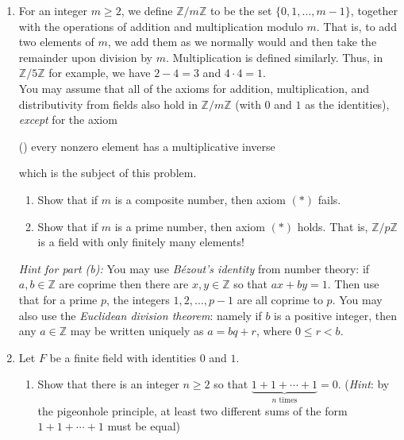 \documentclass[12pt, letterpaper]{article}
\newcommand{\0}{\mathbf{0}}
\newcommand{\1}{\mathbf{1}}
\begin{document}
\begin{enumerate}
    \vspace{0.5cm}

    \item 
    For an integer $m \geq 2$, we define $\mathbb{Z}/m\mathbb{Z}$ to be the set $\{0, 1, \dots, m - 1\}$, together with the operations of addition and multiplication modulo $m$. That is, to add two elements of $m$, we add them as we normally would and then take the remainder upon division by $m$. Multiplication is defined similarly. Thus, in $\mathbb{Z}/5\mathbb{Z}$ for example, we have $2 - 4 = 3$ and $4 \cdot 4 = 1$.\\

    You may assume that all of the axioms for addition, multiplication, and distributivity from fields also hold in $\mathbb{Z}/m\mathbb{Z}$ (with $0$ and $1$ as the identities), \textit{except} for the axiom

    (\ast) every nonzero element has a multiplicative inverse

    which is the subject of this problem.
    \begin{enumerate}
        \item 
        Show that if $m$ is a composite number, then axiom $(\ast)$ fails.

        \item 
        Show that if $m$ is a prime number, then axiom $(\ast)$ holds. That is, $\mathbb{Z}/p\mathbb{Z}$ is a field with only finitely many elements!
    \end{enumerate}
    \textit{Hint for part (b):} You may use \textit{B\'ezout's identity} from number theory: if $a, b \in \mathbb{Z}$ are coprime then there are $x, y \in \mathbb{Z}$ so that $ax + by = 1$. Then use that for a prime $p$, the integers $1, 2, \dots, p - 1$ are all coprime to $p$. You may also use the \textit{Euclidean division theorem}: namely if $b$ is a positive integer, then any $a \in \mathbb{Z}$ may be written uniquely as $a = bq + r$, where $0 \leq r < b$.

    \vspace{0.5cm}

    \item 
    Let $F$ be a finite field with identities $0$ and $1$.
    \begin{enumerate}
        \item 
        Show that there is an integer $n \geq 2$ so that $\underbrace{1 + 1 + \cdots + 1}_{n \text{ times}} = 0$. (\textit{Hint}: by the pigeonhole principle, at least two different sums of the form $1 + 1 + \cdots + 1$ must be equal)\\


\end{enumerate}
\end{enumerate}
\end{document}
